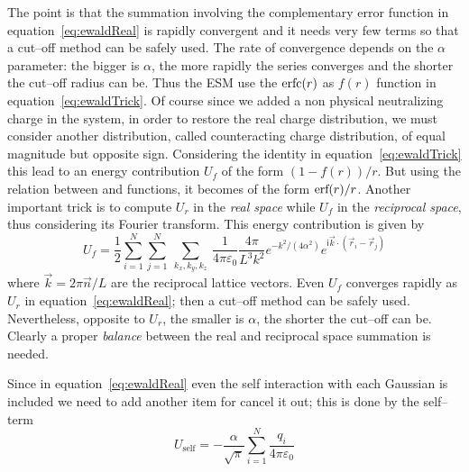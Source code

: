 The point is that the summation involving the complementary error function in equation~\eqref{eq:ewaldReal} is
rapidly convergent and it needs very few terms so that a cut--off method can be safely used. The rate of
convergence depends on the $\alpha$ parameter: the bigger is $\alpha$, the more rapidly the series converges and
the shorter the cut--off radius can be. Thus the \ac{ESM} use the $\text{erfc}(r)$ as $f(r)$ function in
equation~\eqref{eq:ewaldTrick}. Of course since we added a non physical neutralizing charge in the system, in
order to restore the real charge distribution, we must consider another distribution, called counteracting charge
distribution, of equal magnitude but opposite sign. Considering the identity in equation~\eqref{eq:ewaldTrick}
this lead to an energy contribution $U_f$ of the form $(1-f(r))/r$. But using the relation between \erfc{} and 
\erf{} functions, it becomes of the form $\text{erf}(r)/r$. Another important trick is to compute $U_r$ in the 
\textit{real space} while $U_f$ in the \textit{reciprocal space}, thus considering its Fourier transform. This 
energy contribution is given by 
\begin{equation}
	U_f = \frac{1}{2}\sum_{i=1}^N\sum_{j=1}^N\ \sum_{k_x,k_y,k_z}\ \frac{1}{4\pi\varepsilon_0}\frac{4\pi}{L^3k^2}e^{-k^2/(4\alpha^2)}e^{\mathsf{i}{\vec k \cdot (\vec r_i - \vec r_j)}}
	\label{eq:ewaldReciprocal}
\end{equation}
where $\vec k = 2\pi\vec n/L$ are the reciprocal lattice vectors. Even $U_f$ converges rapidly as $U_r$ in
equation~\eqref{eq:ewaldReal}; then a cut--off method can be safely used. Nevertheless, opposite to $U_r$, the
smaller is $\alpha$, the shorter the cut--off can be. Clearly a proper \textit{balance} between the real and
reciprocal space summation is needed.

Since in equation~\eqref{eq:ewaldReal} even the self interaction with each Gaussian is included we need to add
another item for cancel it out; this is done by the self--term
\begin{equation}
	U_\text{self} = -\frac{\alpha}{\sqrt{\pi}}\sum_{i=1}^N\frac{q_i}{4\pi\varepsilon_0}
	\label{eq:EwaldselfTerm}
\end{equation}

